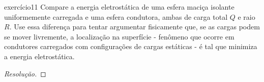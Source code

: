 \begin{exercício}{}{exercício11}
    Compare a energia eletrostática de uma esfera maciça isolante uniformemente carregada e uma esfera condutora, ambas de carga total \(Q\) e raio \(R\). Use essa diferença para tentar argumentar fisicamente que, se as cargas podem se mover livremente, a localização na superfície - fenômeno que ocorre em condutores carregados com configurações de cargas estáticas - é tal que minimiza a energia eletrostática.
\end{exercício}
\begin{proof}[Resolução]

\end{proof}
